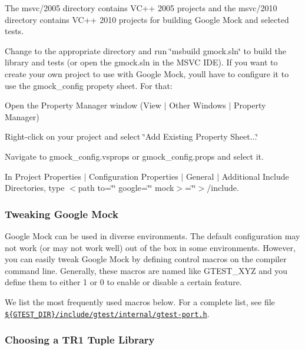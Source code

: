The msvc/2005 directory contains VC++ 2005 projects and the msvc/2010 directory contains VC++ 2010 projects for building Google Mock and selected tests.

Change to the appropriate directory and run \char`\"{}msbuild gmock.\+sln\char`\"{} to build the library and tests (or open the gmock.\+sln in the M\+S\+VC I\+DE). If you want to create your own project to use with Google Mock, you\textquotesingle{}ll have to configure it to use the {\ttfamily gmock\+\_\+config} propety sheet. For that\+:


\begin{DoxyItemize}
\item Open the Property Manager window (View $\vert$ Other Windows $\vert$ Property Manager)
\item Right-\/click on your project and select \char`\"{}\+Add Existing Property Sheet...\char`\"{}
\item Navigate to {\ttfamily gmock\+\_\+config.\+vsprops} or {\ttfamily gmock\+\_\+config.\+props} and select it.
\item In Project Properties $\vert$ Configuration Properties $\vert$ General $\vert$ Additional Include Directories, type $<$path to=\char`\"{}\char`\"{} google=\char`\"{}\char`\"{} mock$>$=\char`\"{}\char`\"{}$>$/include.
\end{DoxyItemize}

\subsubsection*{Tweaking Google Mock}

Google Mock can be used in diverse environments. The default configuration may not work (or may not work well) out of the box in some environments. However, you can easily tweak Google Mock by defining control macros on the compiler command line. Generally, these macros are named like {\ttfamily G\+T\+E\+S\+T\+\_\+\+X\+YZ} and you define them to either 1 or 0 to enable or disable a certain feature.

We list the most frequently used macros below. For a complete list, see file \href{../googletest/include/gtest/internal/gtest-port.h}{\tt \$\{G\+T\+E\+S\+T\+\_\+\+D\+IR\}/include/gtest/internal/gtest-\/port.\+h}.

\subsubsection*{Choosing a T\+R1 Tuple Library}

